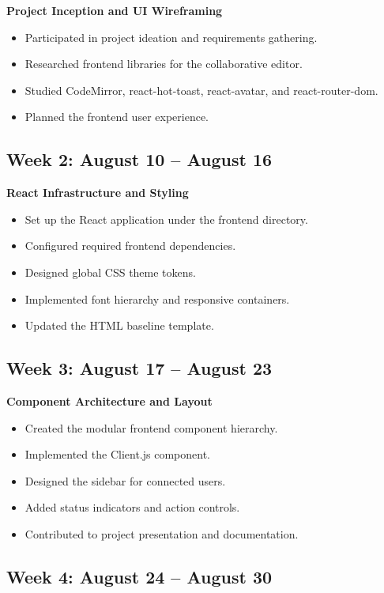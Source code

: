 \documentclass[12pt,a4paper,oneside]{report}
\begin{document}
\textbf{Project Inception and UI Wireframing}

\begin{itemize}
    \item Participated in project ideation and requirements gathering.
    \item Researched frontend libraries for the collaborative editor.
    \item Studied CodeMirror, react-hot-toast, react-avatar,
    and react-router-dom.
    \item Planned the frontend user experience.
\end{itemize}

\subsection*{Week 2: August 10 -- August 16}

\textbf{React Infrastructure and Styling}

\begin{itemize}
    \item Set up the React application under the frontend directory.
    \item Configured required frontend dependencies.
    \item Designed global CSS theme tokens.
    \item Implemented font hierarchy and responsive containers.
    \item Updated the HTML baseline template.
\end{itemize}

\subsection*{Week 3: August 17 -- August 23}

\textbf{Component Architecture and Layout}

\begin{itemize}
    \item Created the modular frontend component hierarchy.
    \item Implemented the Client.js component.
    \item Designed the sidebar for connected users.
    \item Added status indicators and action controls.
    \item Contributed to project presentation and documentation.
\end{itemize}

\subsection*{Week 4: August 24 -- August 30}
\end{document}

